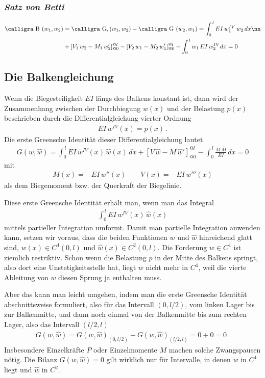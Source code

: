 \subsubsection{{\em Satz von Betti\/}}
\begin{align}
\text{\normalfont\calligra B\,\,}(w_1, w_2) &= \text{\normalfont\calligra G,\,}(w_1,w_2) - \text{\normalfont\calligra G\,\,}(w_2,w_1) = \int_0^{\,l} EI\,w_1^{IV}\,w_2\,dx\nn \\
& + [V_1\,w_2 - M_1\,w_2']_{@0}^{@l} - [V_2\,w_1 - M_2\,w_1']_{@0}^{@l} - \int_0^{\,l} w_1\,EI\,w_2^{IV}dx = 0
\end{align}

\subsection{Die Balkengleichung}
Wenn die Biegesteifigkeit $ EI $ l\"{a}ngs des Balkens konstant ist, dann wird der Zusammenhang zwischen der Durchbiegung $ w(x) $ und der Belastung $ p(x) $ beschrieben durch die Differentialgleichung vierter Ordnung
\begin{align}
EI\,w^{IV}(x) = p(x)\,.
\end{align}
Die erste Greensche Identit\"{a}t dieser Differentialgleichung lautet
\begin{align}
G(w,\hat{w}) = \int_0^{\,l} EI\,w^{IV}(x)\,\hat{w}(x)\,dx + [V\,\hat{w} - M\,\hat{w}']_{@0}^{@l} - \int_0^{\,l} \frac{M\,\hat{M}}{EI}\,dx = 0
\end{align}
mit
\begin{align}
M(x) = - EI\,w''(x) \qquad V(x) = - EI\,w'''(x)
\end{align}
als dem Biegemoment bzw. der Querkraft der Biegelinie.

Diese erste Greensche Identit\"{a}t erh\"{a}lt man, wenn man das Integral
\begin{align}
\int_0^{\,l} EI\,w^{IV}(x)\,\hat{w}(x)
\end{align}
mittels partieller Integration umformt. Damit man partielle Integration anwenden kann, setzen wir voraus, dass die beiden Funktionen $w$ und $\hat{w}$ hin\-reich\-end glatt sind, $w(x) \in C^4(0,l)$ und $\hat{w}(x) \in C^2(0,l)$. Die Forderung $w \in C^4 $ ist ziemlich restriktiv. Schon wenn die Belastung $p$ in der Mitte des Balkens springt, also dort eine Unstetigkeitsstelle hat, liegt $ w $ nicht mehr in $C^4$, weil die vierte Ableitung von $ w $ diesen Sprung ja enthalten muss.

Aber das kann man leicht umgehen, indem man die erste Greensche Identit\"{a}t abschnittsweise formuliert, also f\"{u}r das Intervall $(0, l/2) $, vom linken Lager bis zur Balkenmitte, und dann noch einmal von der Balkenmitte bis zum rechten Lager, also das Intervall $(l/2,l)$
\begin{align}
G(w,\hat{w}) = G(w,\hat{w})_{(0,l/2) }+ G(w,\hat{w})_{(l/2,l)} = 0 + 0 = 0\,.
\end{align}
Insbesondere Einzel\-kr\"{a}fte $P$ oder Einzelmomente $M$ machen solche Zwangs\-pausen n\"{o}tig. Die Bilanz $G(w,\hat{w}) = 0$ gilt wirklich nur f\"{u}r Intervalle, in denen $w$ in $C^4$ liegt und $\hat{w}$ in $C^2$.


